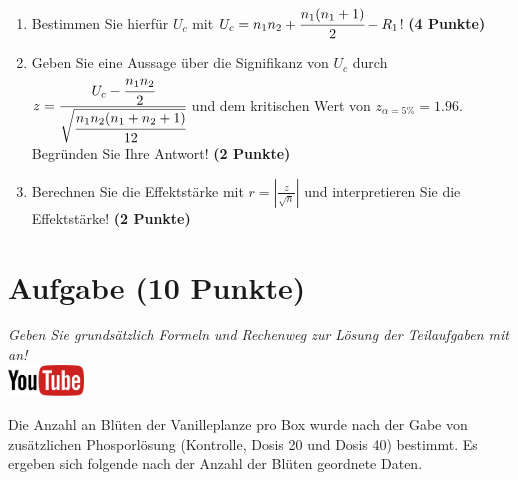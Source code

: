 \documentclass[a4paper, 9pt]{scrartcl}\usepackage[]{graphicx}\usepackage[]{xcolor}
\begin{document}
\begin{enumerate}
\item Bestimmen Sie hierf{\"u}r $U_c$ mit $U_c = n_1n_2 +
  \cfrac{n_1(n_1+1)}{2}-R_1$! \textbf{(4 Punkte)} 
\item Geben Sie eine Aussage {\"u}ber die Signifikanz von $U_c$ durch
  $z = \cfrac{U_c -
    \cfrac{n_1n_2}{2}}{\sqrt{\cfrac{n_1n_2(n_1+n_2+1)}{12}}}$ und dem
  kritischen Wert von $z_{\alpha = 5\%} = 1.96$. Begr{\"u}nden Sie Ihre
  Antwort! \textbf{(2 Punkte)}
\item Berechnen Sie die Effektst{\"a}rke mit $r = |\frac{z}{\sqrt{n}}| $ und
  interpretieren Sie die Effektst{\"a}rke! \textbf{(2 Punkte)} 
\end{enumerate} 
\clearpage

\section{Aufgabe \hfill (10 Punkte)}

\textit{Geben Sie grunds{\"a}tzlich Formeln und Rechenweg zur L{\"o}sung der
  Teilaufgaben mit an!} \\[1Ex]

\hfill\href{https://youtu.be/gC0SXiIG2wQ}{\includegraphics[width =
  2cm]{img/youtube}} %
\hspace{2Ex}




Die Anzahl an Bl{\"u}ten der Vanilleplanze pro Box wurde nach der Gabe von
zus{\"a}tzlichen Phosporl{\"o}sung (Kontrolle, Dosis 20 und Dosis 40) bestimmt. Es
ergeben sich folgende nach der Anzahl der Bl{\"u}ten geordnete Daten.
\end{document}
